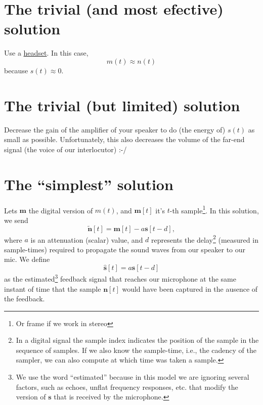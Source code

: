\section{The trivial (and most efective) solution}

Use a \href{https://en.wikipedia.org/wiki/Audio_headset}{headset}. In
this case,
\begin{equation}
  m(t) \approx n(t)
  \label{eq:headset_solution}
\end{equation}
because $s(t)\approx 0$.

\section{The trivial (but limited) solution}

Decrease the gain of the amplifier of your speaker to do (the energy
of) $s(t)$ as small as possible. Unfortunately, this also decreases the
volume of the far-end signal (the voice of our interlocutor) :-/

\section{The ``simplest'' solution}
Lets ${\mathbf m}$ the digital version of $m(t)$, and ${\mathbf m}[t]$
it's $t$-th sample\footnote{Or frame if we work in stereo}. In this
solution, we send
\begin{equation}
  \tilde{\mathbf n}[t] = {\mathbf m}[t] - a{\mathbf s}[t-d],
  \label{eq:simplest}
\end{equation}
where $a$ is an attenuation (scalar) value, and $d$ represents the
delay\footnote{In a digital signal the sample index indicates the
  position of the sample in the sequence of samples. If we also know
  the sample-time, i.e., the cadency of the sampler, we can also
  compute at which time was taken a sample.} (measured in
sample-times) required to propagate the sound waves from our speaker
to our mic. We define
\begin{equation}
  \hat{\mathbf s}[t] = a{\mathbf s}[t-d]
  \label{eq:minimal_filter}
\end{equation}
as the estimated\footnote{We use the word ``estimated'' because in
this model we are ignoring several factors, such as echoes, unflat
frequency responses, etc.  that modify the version of $\mathbf{s}$
that is received by the microphone.} feedback signal that reaches our
microphone at the same instant of time that the sample ${\mathbf
  n}[t]$ would have been captured in the ausence of the feedback.


